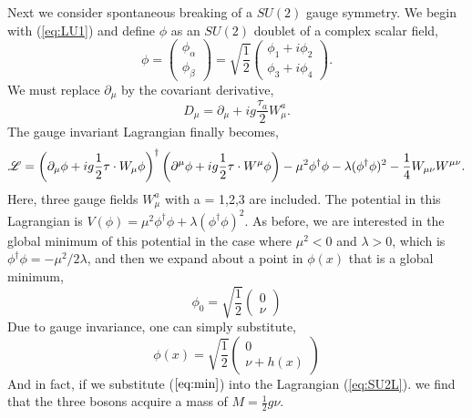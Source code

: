 Next we consider spontaneous breaking of a $SU(2)$ gauge symmetry.
We begin with (\ref{eq:LU1}) and define $\phi$ as an $SU(2)$ doublet 
of a complex scalar field, 
\begin{equation}
\phi=\left(
    \begin{array}{c}
      \phi_{\alpha} \\
      \phi_{\beta}
    \end{array}
  \right) =
  \sqrt{\frac{1}{2}} 
  \left(
    \begin{array}{c}
      \phi_{1}+i\phi_{2} \\
      \phi_{3}+i\phi_{4}
    \end{array}
  \right) .
  \label{eq:phidoublet}
\end{equation}
We must replace $\partial_{\mu}$ by the covariant derivative,
\begin{equation}
D_{\mu}=\partial_{\mu}+ig\frac{\tau_{a}}{2}W_{\mu}^{a}.
\end{equation}
The gauge invariant Lagrangian finally becomes,
\begin{equation}
\mathscr{L}=
\left(\partial_{\mu}\phi + ig \frac{1}{2} \tau \cdot W_{\mu}\phi  \right)^{\dagger}
\left(\partial^{\mu}\phi + ig \frac{1}{2} \tau \cdot W^{\mu}\phi  \right)
-\mu^{2}\phi^{\dagger}\phi
-\lambda (\phi^{\dagger}\phi)^{2}
-\frac{1}{4}W_{\mu\nu}W^{\mu\nu}.
\label{eq:SU2L}
\end{equation}
Here, three gauge fields $W_{\mu}^{a}$ with a = 1,2,3 are included.
The potential in this Lagrangian is $V(\phi)=\mu^{2}\phi^{\dagger}\phi+\lambda (\phi^{\dagger}\phi)^{2}$.
As before, we are interested in the global minimum of this potential
in the case where $\mu^{2}<0$ and $\lambda>0$, which is
$\phi^{\dagger}\phi=-\mu^{2}/2\lambda$, and then we expand about a point in $\phi(x)$ that is a global minimum,
\begin{equation}
\phi_{0}=\sqrt{\frac{1}{2}}
\left(
\begin{array}{c}
      0 \\
      \nu
    \end{array}
\right)
\label{eq:min}
\end{equation}
Due to gauge invariance, one can simply substitute,
\begin{equation}
\phi(x)=\sqrt{\frac{1}{2}}
\left(
\begin{array}{c}
      0 \\
      \nu+h(x)
    \end{array}
\right)
\label{eq:min}
\end{equation}
And in fact, if we substitute ($\ref{eq:min}$) into the Lagrangian (\ref{eq:SU2L}).
we find that the three bosons acquire a mass of $M=\frac{1}{2}g\nu$.

